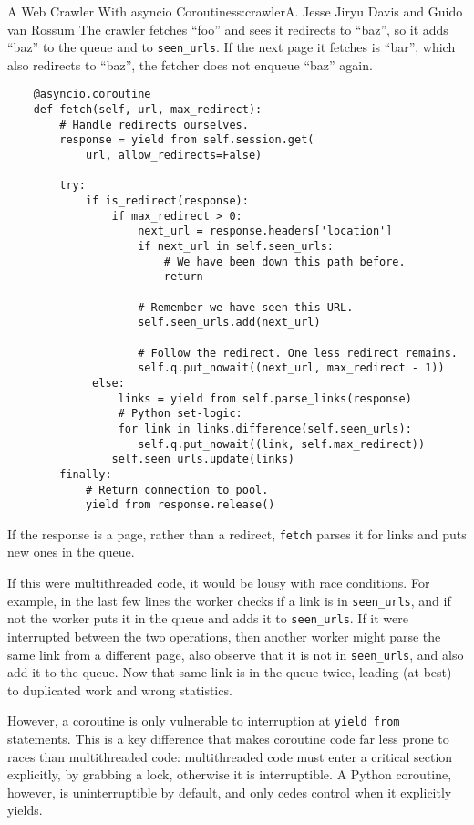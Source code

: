 \begin{aosachapter}{A Web Crawler With asyncio Coroutines}{s:crawler}{A. Jesse Jiryu Davis and Guido van Rossum}
The crawler fetches ``foo'' and sees it redirects to ``baz'', so it adds
``baz'' to the queue and to \texttt{seen\_urls}. If the next page it
fetches is ``bar'', which also redirects to ``baz'', the fetcher does
not enqueue ``baz'' again.

\begin{verbatim}
    @asyncio.coroutine
    def fetch(self, url, max_redirect):
        # Handle redirects ourselves.
        response = yield from self.session.get(
            url, allow_redirects=False)

        try:
            if is_redirect(response):
                if max_redirect > 0:
                    next_url = response.headers['location']
                    if next_url in self.seen_urls:
                        # We have been down this path before.
                        return
    
                    # Remember we have seen this URL.
                    self.seen_urls.add(next_url)
                    
                    # Follow the redirect. One less redirect remains.
                    self.q.put_nowait((next_url, max_redirect - 1))
             else:
                 links = yield from self.parse_links(response)
                 # Python set-logic:
                 for link in links.difference(self.seen_urls):
                    self.q.put_nowait((link, self.max_redirect))
                self.seen_urls.update(links)
        finally:
            # Return connection to pool.
            yield from response.release()
\end{verbatim}

If the response is a page, rather than a redirect, \texttt{fetch} parses
it for links and puts new ones in the queue.

If this were multithreaded code, it would be lousy with race conditions.
For example, in the last few lines the worker checks if a link is in
\texttt{seen\_urls}, and if not the worker puts it in the queue and adds
it to \texttt{seen\_urls}. If it were interrupted between the two
operations, then another worker might parse the same link from a
different page, also observe that it is not in \texttt{seen\_urls}, and
also add it to the queue. Now that same link is in the queue twice,
leading (at best) to duplicated work and wrong statistics.

However, a coroutine is only vulnerable to interruption at
\texttt{yield from} statements. This is a key difference that makes
coroutine code far less prone to races than multithreaded code:
multithreaded code must enter a critical section explicitly, by grabbing
a lock, otherwise it is interruptible. A Python coroutine, however, is
uninterruptible by default, and only cedes control when it explicitly
yields.


\end{aosachapter}
